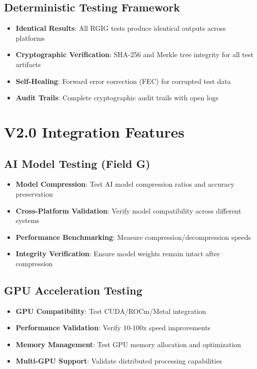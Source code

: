 \documentclass[12pt,a4paper]{article}
\begin{document}
\subsection{Deterministic Testing Framework}
\begin{itemize}
    \item \textbf{Identical Results}: All RGIG tests produce identical outputs across platforms
    \item \textbf{Cryptographic Verification}: SHA-256 and Merkle tree integrity for all test artifacts
    \item \textbf{Self-Healing}: Forward error correction (FEC) for corrupted test data
    \item \textbf{Audit Trails}: Complete cryptographic audit trails with open logs
\end{itemize}

\section{V2.0 Integration Features}

\subsection{AI Model Testing (Field G)}
\begin{itemize}
    \item \textbf{Model Compression}: Test AI model compression ratios and accuracy preservation
    \item \textbf{Cross-Platform Validation}: Verify model compatibility across different systems
    \item \textbf{Performance Benchmarking}: Measure compression/decompression speeds
    \item \textbf{Integrity Verification}: Ensure model weights remain intact after compression
\end{itemize}

\subsection{GPU Acceleration Testing}
\begin{itemize}
    \item \textbf{GPU Compatibility}: Test CUDA/ROCm/Metal integration
    \item \textbf{Performance Validation}: Verify 10-100x speed improvements
    \item \textbf{Memory Management}: Test GPU memory allocation and optimization
    \item \textbf{Multi-GPU Support}: Validate distributed processing capabilities
\end{itemize}
\end{document}
